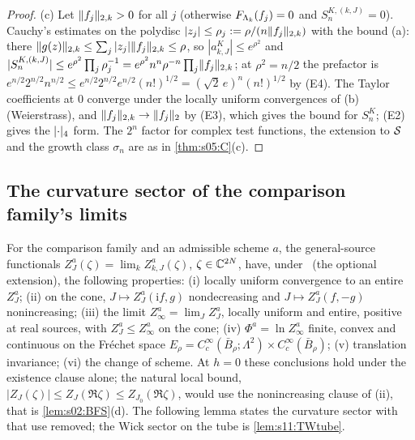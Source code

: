 \begin{proof}
(c) Let $\lVert f_j\rVert_{2,k}>0$ for all $j$ (otherwise $F_{\Lambda_k}(f_j)=0$ and $S^{K,(k,J)}_n=0$). Cauchy's estimates on the polydisc $|z_j|\le\rho_j:=\rho/(n\lVert f_j\rVert_{2,k})$ with the bound (a): there $\lVert g(z)\rVert_{2,k}\le\sum_j|z_j|\lVert f_j\rVert_{2,k}\le\rho$, so $|a^K_{k,J}|\le e^{\rho^2}$ and $|S^{K,(k,J)}_n|\le e^{\rho^2}\prod_j\rho_j^{-1}=e^{\rho^2}n^n\rho^{-n}\prod_j\lVert f_j\rVert_{2,k}$; at $\rho^2=n/2$ the prefactor is $e^{n/2}2^{n/2}n^{n/2}\le e^{n/2}2^{n/2}e^{n/2}(n!)^{1/2}=(\sqrt2\,e)^n(n!)^{1/2}$ by (E4). The Taylor coefficients at $0$ converge under the locally uniform convergences of (b) (Weierstrass), and $\lVert f_j\rVert_{2,k}\to\lVert f_j\rVert_2$ by (E3), which gives the bound for $S^K_n$; (E2) gives the $\lvert \cdot\rvert_{4}$ form. The $2^n$ factor for complex test functions, the extension to $\mathcal S$ and the growth class $\sigma_n$ are as in \cref{thm:s05:C}(c).
\end{proof}

\subsection{The curvature sector of the comparison family's limits}

For the comparison family and an admissible scheme $a$, the general-source functionals $Z^a_J(\zeta)=\lim_kZ^a_{k,J}(\zeta)$, $\zeta\in\mathbb C^{2N}$, have, under \Wtwo\ (the optional extension), the following properties: (i) locally uniform convergence to an entire $Z^a_J$; (ii) on the cone, $J\mapsto Z^a_J(\mathrm if,g)$ nondecreasing and $J\mapsto Z^a_J(f,-g)$ nonincreasing; (iii) the limit $Z^a_\infty=\lim_JZ^a_J$, locally uniform and entire, positive at real sources, with $Z^a_J\le Z^a_\infty$ on the cone; (iv) $\Phi^a=\ln Z^a_\infty$ finite, convex and continuous on the Fr\'echet space $E_\rho=C^\infty_c(\bar B_\rho;\Lambda^2)\times C^\infty_c(\bar B_\rho)$; (v) translation invariance; (vi) the change of scheme. At $h=0$ these conclusions hold under the existence clause alone; the natural local bound, $|Z_J(\zeta)|\le Z_J(\Re\zeta)\le Z_{J_0}(\Re\zeta)$, would use the nonincreasing clause of (ii), that is \cref{lem:s02:BFS}(d). The following lemma states the curvature sector with that use removed; the Wick sector on the tube is \cref{lem:s11:TWtube}.

